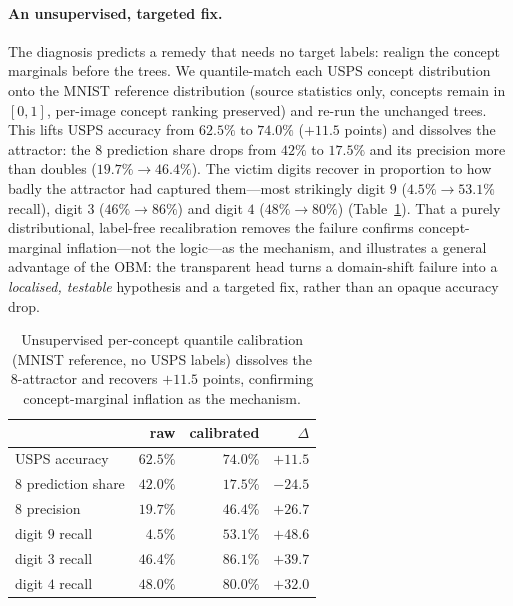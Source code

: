\paragraph{An unsupervised, targeted fix.}
The diagnosis predicts a remedy that needs no target labels: realign the concept
marginals before the trees. We quantile-match each USPS concept distribution
onto the MNIST reference distribution (source statistics only, concepts remain
in $[0,1]$, per-image concept ranking preserved) and re-run the unchanged trees.
This lifts USPS accuracy from $62.5\%$ to $\mathbf{74.0\%}$ ($+11.5$ points) and
dissolves the attractor: the $8$ prediction share drops from $42\%$ to $17.5\%$
and its precision more than doubles ($19.7\%\!\rightarrow\!46.4\%$). The victim
digits recover in proportion to how badly the attractor had captured them---most
strikingly digit $9$ ($4.5\%\!\rightarrow\!53.1\%$ recall), digit $3$
($46\%\!\rightarrow\!86\%$) and digit $4$ ($48\%\!\rightarrow\!80\%$)
(Table~\ref{tab:tree-calib}). That a purely distributional, label-free
recalibration removes the failure confirms concept-marginal inflation---not the
logic---as the mechanism, and illustrates a general advantage of the OBM: the
transparent head turns a domain-shift failure into a \emph{localised, testable}
hypothesis and a targeted fix, rather than an opaque accuracy drop.

\begin{table}[t]
\centering
\small
\begin{tabular}{lrrr}
\toprule
 & raw & calibrated & $\Delta$ \\
\midrule
USPS accuracy       & $62.5\%$ & $\mathbf{74.0\%}$ & $+11.5$ \\
$8$ prediction share & $42.0\%$ & $17.5\%$ & $-24.5$ \\
$8$ precision        & $19.7\%$ & $46.4\%$ & $+26.7$ \\
\midrule
digit $9$ recall     & $\phantom{0}4.5\%$ & $53.1\%$ & $+48.6$ \\
digit $3$ recall     & $46.4\%$ & $86.1\%$ & $+39.7$ \\
digit $4$ recall     & $48.0\%$ & $80.0\%$ & $+32.0$ \\
\bottomrule
\end{tabular}
\caption{Unsupervised per-concept quantile calibration (MNIST reference,
no USPS labels) dissolves the $8$-attractor and recovers $+11.5$ points,
confirming concept-marginal inflation as the mechanism.}
\label{tab:tree-calib}
\end{table}


